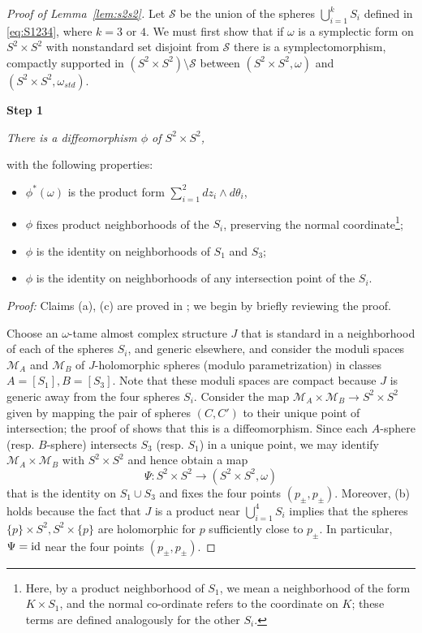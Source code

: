 \documentclass[11pt, reqno]{amsart}
\theoremstyle{remark}
\numberwithin{equation}{subsection}
\numberwithin{figure}{section}
\theoremstyle{customremark}
\newcommand{\NI}{{\noindent}}
\newcommand{\Ss}{{\mathcal S}}
\newcommand{\om}{{\omega}}
\newcommand{\MS}{{\medskip}}
\begin{document}
\begin{proof}[Proof of Lemma~\ref{lem:s2s2}]
Let $\Ss$ be the union of the spheres $\bigcup_{i=1}^kS_i$ defined in \eqref{eq:S1234},  where $k=3$ or $4$.
We must first show that if $\om$ is a symplectic  form on $S^2 \times S^2$ with nonstandard set disjoint from $\Ss$
there is a
symplectomorphism,
compactly supported in $(S^2 \times S^2) \setminus \Ss$ between  $(S^2 \times S^2, \omega)$ and $(S^2 \times S^2, \om_{std} )$.
\MS

\NI {\bf Step 1} {\it There is a 
diffeomorphism $\phi$
of $S^2 \times S^2$,

with the following properties: 
\begin{itemize}\item[{\rm (a)}] $\phi ^*(\om)$ is the product form $ \sum^2_{i=1} dz_i \wedge d\theta_i $,

\item[{\rm (b)}]  $\phi$ fixes product neighborhoods of the $S_i$, preserving the normal coordinate\footnote{Here, by a product neighborhood of $S_1$, we mean a neighborhood of the form $K \times S_1$, and the normal co-ordinate refers to the coordinate on $K$; these terms are defined analogously for the other $S_i$.};
\item[{\rm (c)}]   $\phi$
is the identity on
neighborhoods of $S_1$ and $S_3$; 
\item[{\rm (d)}]  $\phi$ is the identity on
neighborhoods of any intersection point of the $S_i$.
\end{itemize}
}

\NI {\it Proof:}  Claims (a), (c) are proved in  \cite[Thm. 9.4.7]{JHOL}; we begin by briefly reviewing the proof.

Choose an $\om$-tame almost complex structure $J$ that is standard in a neighborhood of each of the spheres $S_i$, and generic elsewhere, and
consider the moduli spaces $\mathcal{M}_A$ and $\mathcal{M}_B$ of $J$-holomorphic spheres (modulo parametrization) in classes $A = [S_1], B=[S_3]$.  Note that   these moduli spaces are compact because $J$ is generic away from the four spheres $S_i$. 
Consider the map $\mathcal{M}_A \times \mathcal{M}_B \to S^2 \times S^2$ given by mapping the pair of spheres $(C,C')$ to their unique point of intersection; the proof of \cite[Thm. 9.4.7]{JHOL} shows that this is a diffeomorphism.  Since each $A$-sphere (resp. $B$-sphere)  intersects $S_3$ (resp. $S_1$) in a unique point, we may identify $\mathcal{M}_A \times \mathcal{M}_B$ with $S^2 \times S^2$ and hence obtain a map
 $$
 \Psi: S^2 \times S^2 \to (S^2 \times S^2,\omega)
 $$
 that is the identity on $S_1\cup S_3$ and fixes the four points $(p_\pm, p_\pm)$.  Moreover,  (b) holds because the fact that
  $J$ is a product near  $\bigcup_{i=1}^4S_i$ implies that the spheres $\{p\}\times S^2, S^2\times  \{p\}$ are holomorphic for $p$ sufficiently close to $p_\pm$.  In particular, $\Psi={\rm id}$ near the four points $(p_\pm,p_\pm)$.
\MS


\end{proof}
\end{document}
